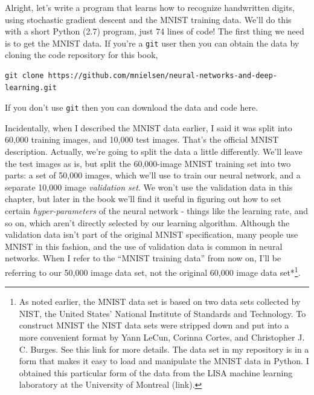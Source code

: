 

Alright, let's write a program that learns how to recognize handwritten digits, using stochastic gradient descent and the MNIST training data. We'll do this with a short Python (2.7) program, just 74 lines of code! The first thing we need is to get the MNIST data. If you're a \texttt{git} user then you can obtain the data by cloning the code repository for this book,



\begin{lstlisting}
git clone https://github.com/mnielsen/neural-networks-and-deep-learning.git

\end{lstlisting}


If you don't use \texttt{git} then you can download the data and code here.


Incidentally, when I described the MNIST data earlier, I said it was split into 60,000 training images, and 10,000 test images. That's the official MNIST description. Actually, we're going to split the data a little differently. We'll leave the test images as is, but split the 60,000-image MNIST training set into two parts: a set of 50,000 images, which we'll use to train our neural network, and a separate 10,000 image \emph{validation set}. We won't use the validation data in this chapter, but later in the book we'll find it useful in figuring out how to set certain \emph{hyper-parameters} of the neural network - things like the learning rate, and so on, which aren't directly selected by our learning algorithm. Although the validation data isn't part of the original MNIST specification, many people use MNIST in this fashion, and the use of validation data is common in neural networks. When I refer to the ``MNIST training data'' from now on, I'll be referring to our 50,000 image data set, not the original 60,000 image data set*\footnote{As noted earlier, the MNIST data set is based on two data sets collected by NIST, the United States' National Institute of Standards and Technology. To construct MNIST the NIST data sets were stripped down and put into a more convenient format by Yann LeCun, Corinna Cortes, and Christopher J. C. Burges. See this link for more details. The data set in my repository is in a form that makes it easy to load and manipulate the MNIST data in Python. I obtained this particular form of the data from the LISA machine learning laboratory at the University of Montreal (link).}.


